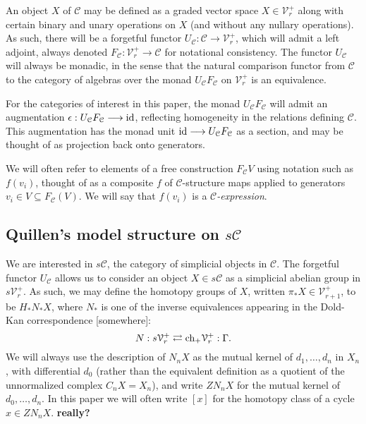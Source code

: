 \documentclass[11pt]{amsart}
\theoremstyle{plain}
\theoremstyle{definition}
\renewcommand{\to}{\longrightarrow}
\newcommand{\calC}{\mathcal{C}}
\newcommand{\calV}{\mathcal{V}}
\theoremstyle{plain}
\newcommand{\vect}[2]{\calV^{#1}_{#2}}
\begin{document}
\begin{Conventions and notation}
An object $X$ of $\calC$ may be defined as a graded vector space $X\in\vect{+}{r}$ along with certain binary and unary operations on $X$ (and without any nullary operations). As such, there will be a forgetful functor $U_\calC:\calC\to\vect{+}{r}$, which will admit a left adjoint, always denoted $F_\calC:\vect{+}{r}\to\calC$ for notational consistency. The functor $U_{\calC}$ will always be monadic, in the sense that the natural comparison functor from $\calC$ to the category of algebras over the monad $U_{\calC}F_{\calC}$ on $\vect{+}{r}$ is an equivalence.

For the categories of interest in this paper, the monad $U_{\calC}F_{\calC}$ will admit an augmentation $\epsilon:U_{\calC}F_{\calC}\to\textup{id}$, reflecting homogeneity in the relations defining $\calC$. This augmentation has the monad unit $\textup{id}\to U_{\calC}F_{\calC}$ as a section, and may be thought of as projection back onto generators.

We will often refer to elements of a free construction $F_\calC V$ using notation such as $f(v_i)$, thought of as a composite $f$ of $\calC$-structure maps applied to generators $v_i\in V\subseteq F_\calC(V)$. We will say that $f(v_i)$ is a \emph{$\calC$-expression}.



\subsection{Quillen's model structure on $s\calC$}
We are interested in $s\calC$, the category of simplicial objects in $\calC$. The forgetful functor $U_\calC$ allows us to consider an object $X\in s\calC$ as a simplicial abelian group in $s\vect{+}{r}$. As such, we may define the homotopy groups of $X$, written $\pi_*X\in \vect{+}{r+1}$, to be $H_*N_*X$, where $N_*$ is one of the inverse equivalences appearing in the Dold-Kan correspondence [somewhere]: \[N:s\vect{+}{r}\rightleftarrows \textup{ch}_+ \vect{+}{r}
:\Gamma.\]
We will always use the description of $N_nX$ as the mutual kernel of $d_1,\ldots,d_n$ in $X_n$, with differential $d_0$ (rather than the equivalent definition as a quotient of the unnormalized complex $C_nX=X_n$), and write $ZN_nX$ for the mutual kernel of $d_0,\ldots,d_n$. In this paper we will often write $[x]$ for the homotopy class of a cycle $x\in ZN_nX$. \textbf{really?}


\end{Conventions and notation}
\end{document}
